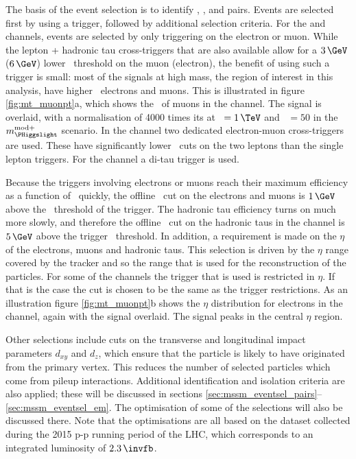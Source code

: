 The basis of the event selection is to identify \mutau, \etau,
\tautau and \emu pairs. Events are selected first by using a trigger,
followed by additional selection criteria. For the \etau
and \mutau channels, events are selected by only triggering on the electron or muon. 
While the lepton + hadronic tau cross-triggers that are also available
allow for a $3\,\GeV$ ($6\,\GeV$) lower \pT~threshold on the
muon (electron), the benefit of using such a trigger is small: 
most of the signals at high mass, the region of interest in this
analysis, have higher \pT~electrons and muons. This is illustrated
in figure \ref{fig:mt_muonpt}a, which shows the \pT~of muons in the
\mutau channel. The signal is overlaid, with a normalisation of 4000 times its \xsbr 
 at \mA~$=1\,\TeV$ and \tanb~$=50$ in the $m_{\PHiggslight}^{\text{mod}+}$ scenario.
In the \emu channel two dedicated electron-muon cross-triggers
are used. These have significantly lower \pT~cuts 
on the two leptons than the single lepton triggers. For the 
\tautau channel a di-tau trigger is used.

Because the triggers involving electrons or muons reach 
their maximum efficiency as a function of \pT~quickly, the offline \pT~cut
on the electrons and muons is $1\,\GeV$ above the \pT~threshold of the trigger. The
hadronic tau efficiency turns on much more slowly, and therefore the offline \pT~cut
on the hadronic taus in the \tautau channel is $5\,\GeV$ above the trigger \pT~threshold.
In addition, a requirement is made on the $\eta$ of the electrons, muons and
hadronic taus. This selection is driven by the $\eta$ range covered by the tracker and
so the range that is used for the reconstruction of the particles. For some of the
channels the trigger that is used is restricted in $\eta$. If that is the case
the cut is chosen to be the same as the trigger restrictions.
As an illustration figure \ref{fig:mt_muonpt}b shows
the $\eta$ distribution for electrons in the \etau channel, again with the signal overlaid.
The signal peaks in the central $\eta$ region.

Other selections include cuts on the transverse and longitudinal impact parameters $d_{xy}$ and $d_{z}$, which
ensure that the particle is likely to have
originated from the primary vertex. This reduces the number of selected particles
which come from pileup interactions.
Additional identification and isolation criteria
are also applied; these will be discussed in sections \ref{sec:mssm_eventsel_pairs}--\ref{sec:mssm_eventsel_em}.
The optimisation of some of the selections will also be discussed there. Note that 
the optimisations are all based on the dataset collected during the 2015 p-p running period of the \ac{LHC}, which
corresponds to an integrated luminosity of $2.3\,\invfb$. 

